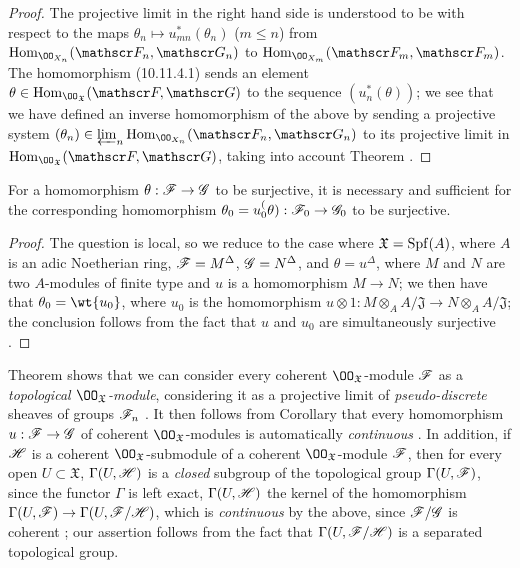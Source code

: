 \begin{proof}
\label{proof-1.10.11.4}
The projective limit in the right hand side is understood to be with respect to the maps $\theta_n\mapsto u_{mn}^*(\theta_n)$ ($m\leq n$) from $\Hom_{\OO_{X_n}}(\sh{F}_n,\sh{G}_n)$ to $\Hom_{\OO_{X_m}}(\sh{F}_m,\sh{F}_m)$.
The homomorphism (10.11.4.1) sends an element $\theta\in\Hom_{\OO_\mathfrak{X}}(\sh{F},\sh{G})$ to the sequence $(u_n^*(\theta))$; we see that we have defined an inverse homomorphism of the above by sending a projective system $(\theta_n)\in\varprojlim_n\Hom_{\OO_{X_n}}(\sh{F}_n,\sh{G}_n)$ to its projective limit in $\Hom_{\OO_\mathfrak{X}}(\sh{F},\sh{G})$, taking into account Theorem .
\end{proof}

\begin{cor}[10.11.5]
\label{1.10.11.5}
For a homomorphism $\theta:\sh{F}\to\sh{G}$ to be surjective, it is necessary and sufficient for the corresponding homomorphism $\theta_0=u_0^(\theta):\sh{F}_0\to\sh{G}_0$ to be surjective.
\end{cor}

\begin{proof}
\label{proof-1.10.11.5}
The question is local, so we reduce to the case where $\mathfrak{X}=\operatorname{Spf}(A)$, where $A$ is an adic Noetherian ring, $\mathscr{F}=M^\Delta$, $\mathscr{G}=N^\Delta$, and $\theta=u^\Delta$, where $M$ and $N$ are two $A$-modules of finite type and $u$ is a homomorphism $M\to N$; we then have that $\theta_0=\wt{u_0}$, where $u_0$ is the homomorphism $u\otimes 1:M\otimes_A A/\mathfrak{J}\to N\otimes_A A/\mathfrak{J}$; the conclusion follows from the fact that $u$ and $u_0$ are simultaneously surjective .
\end{proof}

\begin{env}[10.11.6]
\label{1.10.11.6}
Theorem  shows that we can consider every coherent $\OO_\mathfrak{X}$-module $\mathscr{F}$ as a \emph{topological $\OO_\mathfrak{X}$-module}, considering it as a projective limit of \emph{pseudo-discrete} sheaves of groups $\mathscr{F}_n$ .
It then follows from Corollary  that every homomorphism $u:\sh{F}\to\sh{G}$ of coherent $\OO_\mathfrak{X}$-modules is automatically \emph{continuous}
.
In addition, if $\mathscr{H}$ is a coherent $\OO_\mathfrak{X}$-submodule of a coherent $\OO_\mathfrak{X}$-module $\mathscr{F}$, then for every open $U\subset\mathfrak{X}$, $\Gamma(U,\mathscr{H})$ is a \emph{closed} subgroup of the topological group $\Gamma(U,\mathscr{F})$, since the functor $\Gamma$ is left exact, $\Gamma(U,\mathscr{H})$ the kernel of the homomorphism $\Gamma(U,\sh{F})\to\Gamma(U,\sh{F}/\sh{H})$, which is \emph{continuous} by the above, since $\mathscr{F}/\mathscr{G}$ is coherent ; our assertion follows from the fact that $\Gamma(U,\mathscr{F}/\mathscr{H})$ is a separated topological group.
\end{env}

